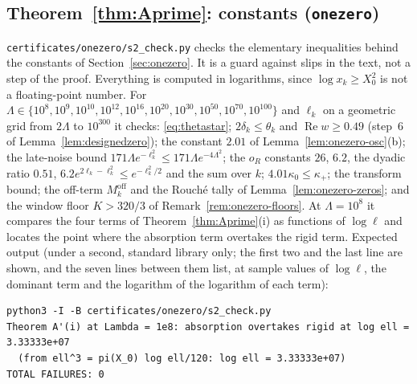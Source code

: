 \subsection{Theorem~\texorpdfstring{\ref{thm:Aprime}}{A'}: constants (\texttt{onezero})}\label{app:cert-onezero}
\texttt{certificates/onezero/s2\_check.py} checks the elementary inequalities behind the constants of Section~\ref{sec:onezero}. It is a
guard against slips in the text, not a step of the proof. Everything is computed in logarithms, since $\log x_k\ge X_0^2$ is not a
floating-point number. For $\Lambda\in\{10^8,10^9,10^{10},10^{12},10^{16},10^{20},10^{30},10^{50},10^{70},10^{100}\}$ and $\ell_k$ on a geometric
grid from $2\Lambda$ to $10^{300}$ it checks: \eqref{eq:thetastar}; $2\delta_k\le\theta_k$ and $\operatorname{Re}w\ge0.49$ (step~6 of
Lemma~\ref{lem:designedzero}); the constant $2.01$ of Lemma~\ref{lem:onezero-osc}(b); the late-noise bound $171\Lambda e^{-\ell_k^2}\le
171\Lambda e^{-4\Lambda^2}$; the $o_R$ constants $26$, $6.2$, the dyadic ratio $0.51$, $6.2e^{2\ell_k-\ell_k^2}\le e^{-\ell_k^2/2}$ and the sum over
$k$; $4.01\kappa_0\le\kappa_+$; the transform bound; the off-term $M_k^{\mathrm{off}}$ and the Rouch\'e tally of
Lemma~\ref{lem:onezero-zeros}; and the window floor $K>320/3$ of Remark~\ref{rem:onezero-floors}. At $\Lambda=10^8$ it compares the four terms
of Theorem~\ref{thm:Aprime}(i) as functions of $\log\ell$ and locates the point where the absorption term overtakes the rigid term.
Expected output (under a second, standard library only; the first two and the last line are shown, and the seven lines between
them list, at sample values of $\log\ell$, the dominant term and the logarithm of the logarithm of each term):
\begingroup\footnotesize
\begin{verbatim}
python3 -I -B certificates/onezero/s2_check.py
Theorem A'(i) at Lambda = 1e8: absorption overtakes rigid at log ell = 3.33333e+07
  (from ell^3 = pi(X_0) log ell/120: log ell = 3.33333e+07)
TOTAL FAILURES: 0
\end{verbatim}
\endgroup

